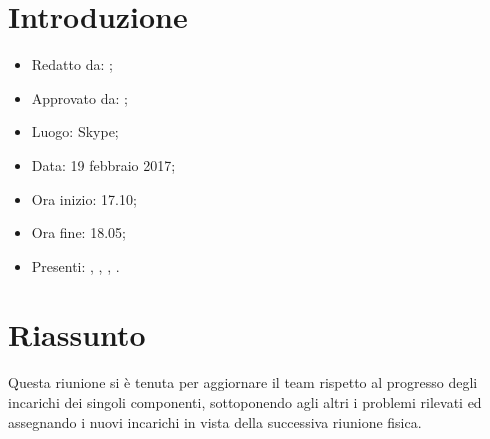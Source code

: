 \section{Introduzione}

	\begin{itemize}
		\item Redatto da: \MC;
		\item Approvato da: \DS;
		\item Luogo: Skype;
		\item Data: 19 febbraio 2017;
		\item Ora inizio: 17.10;
		\item Ora fine: 18.05;
		\item Presenti: \AS, \DS, \MC, \NS.	
	\end{itemize}

\section{Riassunto}
Questa riunione si è tenuta per aggiornare il team rispetto al progresso degli incarichi dei singoli componenti, sottoponendo agli altri i problemi rilevati ed assegnando i nuovi incarichi in vista della successiva riunione fisica.
